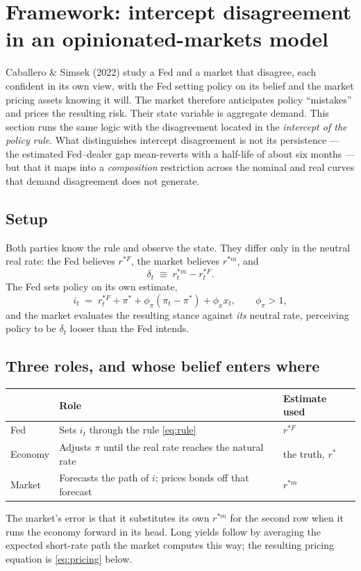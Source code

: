 \documentclass[11pt]{article}
\begin{document}
\section{Framework: intercept disagreement in an opinionated-markets model}
\label{sec:framework}
Caballero \& Simsek (2022) study a Fed and a market that disagree, each confident in its own
view, with the Fed setting policy on its belief and the market pricing assets knowing it will.
The market therefore anticipates policy ``mistakes'' and prices the resulting risk. Their state
variable is aggregate demand. This section runs the same logic with the disagreement located in
the \emph{intercept of the policy rule}. What distinguishes intercept disagreement is not its
persistence --- the estimated Fed--dealer gap mean-reverts with a half-life of about six
months --- but that it maps into a \emph{composition} restriction across the nominal and real
curves that demand disagreement does not generate.
\subsection{Setup}
Both parties know the rule and observe the state. They differ only in the neutral real rate:
the Fed believes $r^{*F}$, the market believes $r^{*m}$, and
\begin{equation}
\delta_t \;\equiv\; r^{*m}_t - r^{*F}_t .
\label{eq:delta}
\end{equation}
The Fed sets policy on its own estimate,
\begin{equation}
i_t \;=\; r^{*F}_t + \pi^{*} + \phi_\pi\!\left(\pi_t - \pi^{*}\right) + \phi_x x_t ,
\qquad \phi_\pi > 1 ,
\label{eq:rule}
\end{equation}
and the market evaluates the resulting stance against \emph{its} neutral rate, perceiving policy
to be $\delta_t$ looser than the Fed intends.
\subsection{Three roles, and whose belief enters where}
\begin{center}\small
\begin{tabular}{@{}lll@{}}
\toprule
& \textbf{Role} & \textbf{Estimate used}\\ \midrule
Fed & Sets $i_t$ through the rule \eqref{eq:rule} & $r^{*F}$\\
Economy & Adjusts $\pi$ until the real rate reaches the natural rate & the truth, $r^{*}$\\
Market & Forecasts the path of $i$; prices bonds off that forecast & $r^{*m}$\\
\bottomrule\end{tabular}
\end{center}
\noindent The market's error is that it substitutes its own $r^{*m}$ for the second row when it
runs the economy forward in its head. Long yields follow by averaging the expected short-rate
path the market computes this way; the resulting pricing equation is \eqref{eq:pricing} below.
\end{document}
